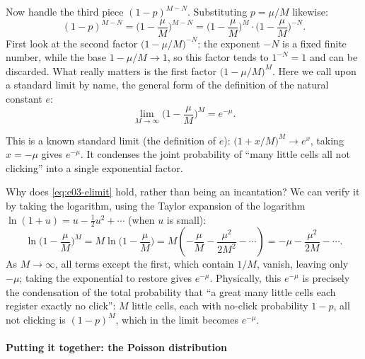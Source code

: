 Now handle the third piece $(1-p)^{M-N}$. Substituting $p=\mu/M$ likewise:
\[
  (1-p)^{M-N}=\Big(1-\frac{\mu}{M}\Big)^{M-N}
  =\Big(1-\frac{\mu}{M}\Big)^{M}\cdot\Big(1-\frac{\mu}{M}\Big)^{-N}.
\]
First look at the second factor $\big(1-\mu/M\big)^{-N}$: the exponent $-N$ is a fixed finite number, while the base $1-\mu/M\to 1$, so this factor tends to $1^{-N}=1$ and can be discarded. What really matters is the first factor $\big(1-\mu/M\big)^{M}$. Here we call upon a standard limit by name, the general form of the definition of the natural constant $e$:
\begin{equation}
  \lim_{M\to\infty}\Big(1-\frac{\mu}{M}\Big)^{M}=e^{-\mu}.
  \label{eq:e03-elimit}
\end{equation}
\begin{formulaexplain}
This is a known standard limit (the definition of $e$): $\big(1+x/M\big)^{M}\to e^{x}$, taking $x=-\mu$ gives $e^{-\mu}$. It condenses the joint probability of ``many little cells all not clicking'' into a single exponential factor.
\end{formulaexplain}
Why does \eqref{eq:e03-elimit} hold, rather than being an incantation? We can verify it by taking the logarithm, using the Taylor expansion of the logarithm $\ln(1+u)=u-\tfrac12u^{2}+\cdots$ (when $u$ is small):
\[
  \ln\Big(1-\frac{\mu}{M}\Big)^{M}
  =M\ln\Big(1-\frac{\mu}{M}\Big)
  =M\left(-\frac{\mu}{M}-\frac{\mu^{2}}{2M^{2}}-\cdots\right)
  =-\mu-\frac{\mu^{2}}{2M}-\cdots .
\]
As $M\to\infty$, all terms except the first, which contain $1/M$, vanish, leaving only $-\mu$; taking the exponential to restore gives $e^{-\mu}$. Physically, this $e^{-\mu}$ is precisely the condensation of the total probability that ``a great many little cells each register exactly no click'': $M$ little cells, each with no-click probability $1-p$, all not clicking is $(1-p)^{M}$, which in the limit becomes $e^{-\mu}$.

\paragraph{Putting it together: the Poisson distribution}


